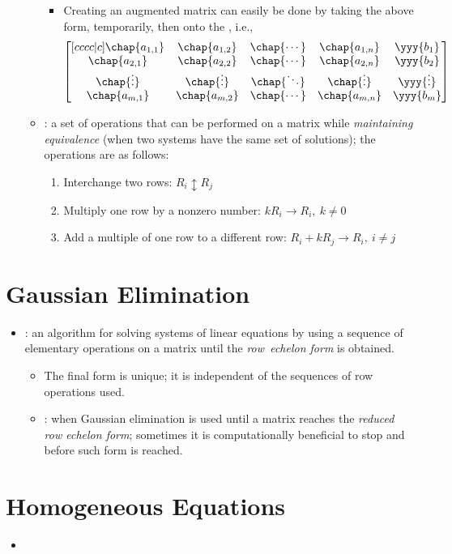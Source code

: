 \begin{itemize}
\begin{itemize}
\begin{itemize}
        \item Creating an augmented matrix can easily be done by taking the above form,  temporarily, then  onto the , i.e.,
      \[%
      \begin{bmatrix}[cccc|c]
        \chap{a_{1,1}} & \chap{a_{1,2}} & \chap{\cdots} & \chap{a_{1,n}} & \yyy{b_1}\\
        \chap{a_{2,1}} & \chap{a_{2,2}} & \chap{\cdots} & \chap{a_{2,n}} & \yyy{b_2}\\
        \chap{\vdots} & \chap{\vdots} & \chap{\ddots} & \chap{\vdots} & \yyy{\vdots} \\
        \chap{a_{m,1}} & \chap{a_{m,2}} & \chap{\cdots} & \chap{a_{m,n}} & \yyy{b_m}
        \end{bmatrix}
      \]%
      \end{itemize} 
    \item {}: a set of operations that can be performed on a matrix while \emph{maintaining equivalence} (when two systems have the same set of solutions); the operations are as follows:
      \begin{enumerate}
        \item Interchange two rows: \emph{\(R_i \updownarrow R_j\)}
        \item Multiply one row by a nonzero number: \emph{\(kR_i \rightarrow R_i,~k\neq 0\)}
        \item Add a multiple of one row to a different row: \emph{\(R_i + kR_j \rightarrow R_i,~i\neq j\)}
      \end{enumerate}
  \end{itemize}
\end{itemize}

\section{Gaussian Elimination}\label{Gaussian Elimination}
\begin{itemize}
  \item {}: an algorithm for solving systems of linear equations by using a sequence of elementary operations on a matrix until the \emph{row~echelon form} is obtained.
    \begin{itemize}
      \item The final form is unique; it is independent of the sequences of row operations used.
      \item {}: when Gaussian elimination is used until a matrix reaches the \emph{reduced row echelon form}; sometimes it is computationally beneficial to stop and before such form is reached.
    \end{itemize}
\end{itemize}

\section{Homogeneous Equations}\label{Homogeneous Equations}
\begin{itemize}
  \item 
\end{itemize}
  
  
